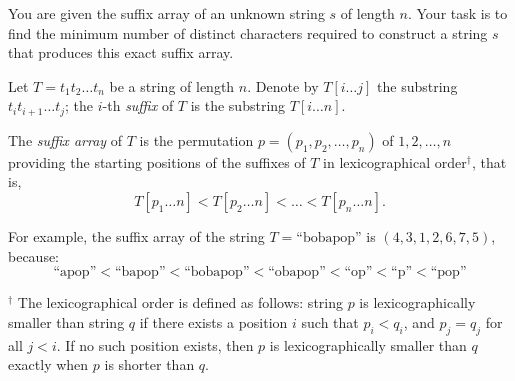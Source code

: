 You are given the suffix array of an unknown string $s$ of length $n$. Your task is to find the minimum number of distinct characters required to construct a string $s$ that produces this exact suffix array.

Let $T = t_1 t_2 \dots t_n$ be a string of length $n$. Denote by $T[i \ldots j]$ the substring $t_i t_{i+1} \dots t_j$; the $i$-th \emph{suffix} of $T$ is the substring $T[i \ldots n]$.

The \emph{suffix array} of $T$ is the permutation $p = (p_1, p_2, \dots, p_n)$ of $1, 2, \dots, n$ providing the starting positions of the suffixes of $T$ in lexicographical order$^{\dagger}$, that is,
$$T[p_1 \ldots n] < T[p_2 \ldots n] < \dots < T[p_n \ldots n].$$

For example, the suffix array of the string $T = \text{``bobapop''}$ is $(4, 3, 1, 2, 6, 7, 5)$, because:$$\text{``apop''} < \text{``bapop''} < \text{``bobapop''} < \text{``obapop''} < \text{``op''} < \text{``p''} < \text{``pop''}$$

{\small $^{\dagger}$ The lexicographical order is defined as follows: string $p$ is lexicographically smaller than string $q$ if there exists a position $i$ such that $p_i < q_i$, and $p_j = q_j$ for all $j < i$. If no such position exists, then $p$ is lexicographically smaller than $q$ exactly when $p$ is shorter than $q$.}
